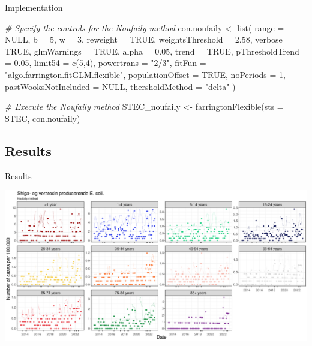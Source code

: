 \documentclass[aspectratio=169]{beamer}
\newenvironment{Shaded}{\begin{snugshade}}{\end{snugshade}}
\newcommand{\AttributeTok}[1]{\textcolor[rgb]{0.77,0.63,0.00}{#1}}
\newcommand{\CommentTok}[1]{\textcolor[rgb]{0.56,0.35,0.01}{\textit{#1}}}
\newcommand{\ConstantTok}[1]{\textcolor[rgb]{0.00,0.00,0.00}{#1}}
\newcommand{\DecValTok}[1]{\textcolor[rgb]{0.00,0.00,0.81}{#1}}
\newcommand{\FloatTok}[1]{\textcolor[rgb]{0.00,0.00,0.81}{#1}}
\newcommand{\FunctionTok}[1]{\textcolor[rgb]{0.00,0.00,0.00}{#1}}
\newcommand{\NormalTok}[1]{#1}
\newcommand{\OtherTok}[1]{\textcolor[rgb]{0.56,0.35,0.01}{#1}}
\newcommand{\StringTok}[1]{\textcolor[rgb]{0.31,0.60,0.02}{#1}}
\begin{document}
\begin{frame}[fragile]{Implementation}
\tiny

\begin{Shaded}
\begin{Highlighting}[]
\CommentTok{\# Specify the controls for the Noufaily method}
\NormalTok{con.noufaily }\OtherTok{\textless{}{-}} \FunctionTok{list}\NormalTok{(}
  \AttributeTok{range =} \ConstantTok{NULL}\NormalTok{, }\AttributeTok{b =} \DecValTok{5}\NormalTok{, }\AttributeTok{w =} \DecValTok{3}\NormalTok{,}
  \AttributeTok{reweight =} \ConstantTok{TRUE}\NormalTok{, }\AttributeTok{weightsThreshold =} \FloatTok{2.58}\NormalTok{,}
  \AttributeTok{verbose =} \ConstantTok{TRUE}\NormalTok{, }\AttributeTok{glmWarnings =} \ConstantTok{TRUE}\NormalTok{,}
  \AttributeTok{alpha =} \FloatTok{0.05}\NormalTok{, }\AttributeTok{trend =} \ConstantTok{TRUE}\NormalTok{, }\AttributeTok{pThresholdTrend =} \FloatTok{0.05}\NormalTok{,}
  \AttributeTok{limit54 =} \FunctionTok{c}\NormalTok{(}\DecValTok{5}\NormalTok{,}\DecValTok{4}\NormalTok{), }\AttributeTok{powertrans =} \StringTok{"2/3"}\NormalTok{,}
  \AttributeTok{fitFun =} \StringTok{"algo.farrington.fitGLM.flexible"}\NormalTok{,}
  \AttributeTok{populationOffset =} \ConstantTok{TRUE}\NormalTok{,}
  \AttributeTok{noPeriods =} \DecValTok{1}\NormalTok{, }\AttributeTok{pastWooksNotIncluded =} \ConstantTok{NULL}\NormalTok{,}
  \AttributeTok{thersholdMethod =} \StringTok{"delta"}
\NormalTok{)}

\CommentTok{\# Execute the Noufaily method}
\NormalTok{STEC\_noufaily }\OtherTok{\textless{}{-}} \FunctionTok{farringtonFlexible}\NormalTok{(}\AttributeTok{sts =}\NormalTok{ STEC, con.noufaily)}
\end{Highlighting}
\end{Shaded}

\normalsize
\end{frame}

\hypertarget{results-1}{%
\subsection{Results}\label{results-1}}

\begin{frame}{Results}
\tiny

\includegraphics[width=1\linewidth]{../figures/STEC_noufaily}

\normalsize
\end{frame}
\end{document}

